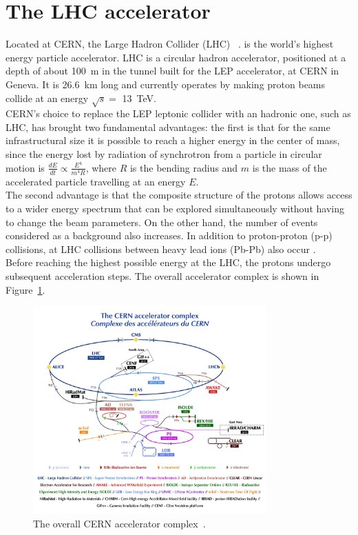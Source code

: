 \section{The LHC accelerator}
Located at CERN, the Large Hadron Collider (LHC) ~\cite{CERN_acc}. is the world’s highest energy particle accelerator.
LHC is a circular hadron accelerator, positioned at a depth of about 100~m in the tunnel built for the LEP accelerator, at CERN in Geneva.
It is 26.6~km long and currently operates by making proton beams collide at an energy $ \sqrt {s} = $ 13~TeV. \\
CERN's choice to replace the LEP leptonic collider with an hadronic one, such as LHC, has brought two fundamental advantages: the first is that for the same infrastructural size it is possible to reach a higher energy in the center of mass, since the energy lost by radiation of synchrotron from a particle in circular motion is $\frac{dE}{dt}\propto\frac{E^4}{m^4R}$, where $R$ is the bending radius and $m$ is the mass of the accelerated particle travelling at an energy $E$.\\
The second advantage is that the composite structure of the protons allows access to a wider energy spectrum that can be explored simultaneously without having to change the beam parameters. On the other hand, the number of events considered as a background also increases.
In addition to proton-proton (p-p) collisions, at LHC collisions between heavy lead ions (Pb-Pb) also occur . \\
Before reaching the highest possible energy at the LHC, the protons undergo subsequent acceleration steps. The overall accelerator complex is shown in Figure~\ref{fig:CERN_complex}.
\begin{figure}[!h]
	\centering
	\includegraphics[width=0.8\textwidth]{Chapters/CH2/figures/CERN_complex}
	\caption{The overall CERN accelerator complex~\cite{CERN_complex}.}
	\label{fig:CERN_complex}
\end{figure}
